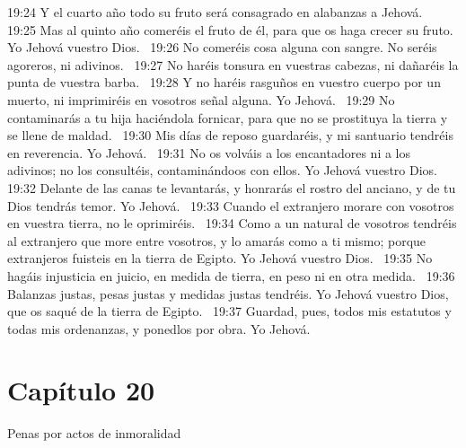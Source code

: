 19:24 Y el cuarto año todo su fruto será consagrado en alabanzas a Jehová.  
19:25 Mas al quinto año comeréis el fruto de él, para que os haga crecer su fruto. Yo Jehová vuestro Dios.  
19:26 No comeréis cosa alguna con sangre. No seréis agoreros, ni adivinos.  
19:27 No haréis tonsura en vuestras cabezas, ni dañaréis la punta de vuestra barba.  
19:28 Y no haréis rasguños en vuestro cuerpo por un muerto, ni imprimiréis en vosotros señal alguna. Yo Jehová.  
19:29 No contaminarás a tu hija haciéndola fornicar,  para que no se prostituya la tierra y se llene de maldad.  
19:30 Mis días de reposo guardaréis, y mi santuario tendréis en reverencia. Yo Jehová.  
19:31 No os volváis a los encantadores ni a los adivinos; no los consultéis, contaminándoos con ellos. Yo Jehová vuestro Dios.  
19:32 Delante de las canas te levantarás, y honrarás el rostro del anciano, y de tu Dios tendrás temor. Yo Jehová.  
19:33 Cuando el extranjero morare con vosotros en vuestra tierra, no le oprimiréis.  
19:34 Como a un natural de vosotros tendréis al extranjero que more entre vosotros, y lo amarás como a ti mismo; porque extranjeros fuisteis en la tierra de Egipto. Yo Jehová vuestro Dios.  
19:35 No hagáis injusticia en juicio, en medida de tierra, en peso ni en otra medida.  
19:36 Balanzas justas, pesas justas y medidas justas tendréis. Yo Jehová vuestro Dios, que os saqué de la tierra de Egipto.  
19:37 Guardad, pues, todos mis estatutos y todas mis ordenanzas, y ponedlos por obra. Yo Jehová. 
\section*{Capítulo 20 }
Penas por actos de inmoralidad  

